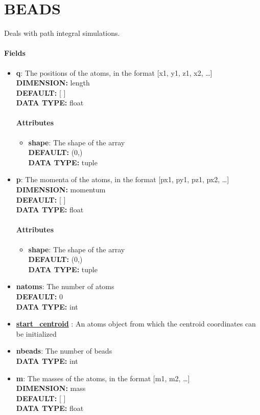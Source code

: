 \section{BEADS}
\label{BEADS}
Deals with path integral simulations.
\paragraph{Fields}
 \begin{itemize}
\item {\bf q}:
 The positions of the atoms, in the format [x1, y1, z1, x2, \ldots  ]
{\\ \bf DIMENSION: }length
{\\ \bf DEFAULT: }[ ]
{\\ \bf DATA TYPE: }float
\paragraph{Attributes}
 \begin{itemize}
\item {\bf shape}:
 The shape of the array
{\\ \bf DEFAULT: }(0,)
{\\ \bf DATA TYPE: }tuple
\end{itemize}
 
\item {\bf p}:
 The momenta of the atoms, in the format [px1, py1, pz1, px2, \ldots  ]
{\\ \bf DIMENSION: }momentum
{\\ \bf DEFAULT: }[ ]
{\\ \bf DATA TYPE: }float
\paragraph{Attributes}
 \begin{itemize}
\item {\bf shape}:
 The shape of the array
{\\ \bf DEFAULT: }(0,)
{\\ \bf DATA TYPE: }tuple
\end{itemize}
 
\item {\bf natoms}:
 The number of atoms
{\\ \bf DEFAULT: }0
{\\ \bf DATA TYPE: }int
\item {\bf \hyperref[ATOMS]{start\_centroid} }:
 An atoms object from which the centroid coordinates can be initialized
\item {\bf nbeads}:
 The number of beads
{\\ \bf DATA TYPE: }int
\item {\bf m}:
 The masses of the atoms, in the format [m1, m2, \ldots  ]
{\\ \bf DIMENSION: }mass
{\\ \bf DEFAULT: }[ ]
{\\ \bf DATA TYPE: }float

\end{itemize}
